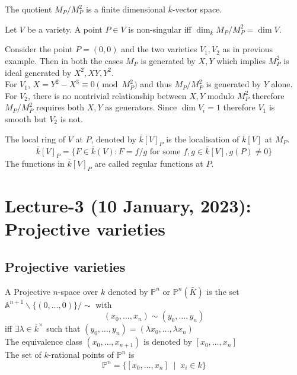 \documentclass[oneside, 12pt]{scrbook}
\theoremstyle{theorem}
\begin{document}
The quotient $M_{P}/M_{P}^2$ is a finite dimensional $\bar{k}$-vector space. 
\begin{proposition}
Let $V$ be a variety. A point $P \in V$ is non-singular iff $\dim_{\bar{k}} M_{P}/M_{P}^2 = \dim V$. 
\end{proposition}

\begin{example}
Consider the point $P = (0,0)$ and the two varieties $V_{1},V_{2}$ as in previous example. Then in both the cases $M_{P}$ is generated by $X,Y$ which implies $M_{P}^2$ is ideal generated by $X^2 , XY, Y^2$. \\

For $V_{1}$, $X=Y^2 - X^3 \equiv 0 \pmod{M_{P}^2}$ and thus $M_{P}/M_{P}^2$ is generated by $Y$ alone. \\

For $V_{2}$, there is no nontrivial relationship between $X,Y$ modulo $M_{P}^2$ therefore $M_{P}/M_{P}^2$ requires both $X,Y$ as generators. Since $\dim V_{i} = 1$ therefore $V_{1}$ is smooth but $V_{2}$ is not. 
\end{example}

\begin{proposition}
The local ring of $V$ at $P$, denoted by $\bar{k}[V]_{P}$ is the localisation of $\bar{k}[V]$ at $M_{P}$. 
\begin{equation}
\bar{k}[V]_{P} = \{F \in \bar{k}(V): F = f/g \text{ for some } f,g \in \bar{k}[V], g(P)\neq 0\}
\end{equation}
The functions in $\bar{k}[V]_{P}$ are called regular functions at $P$.
\end{proposition}

\chapter{Lecture-3 (10 January, 2023): Projective varieties}

\section{Projective varieties}

\begin{definition}
A Projective $n$-space over $k$ denoted by $\mathbb{P}^n$ or $\mathbb{P}^{n}(\bar{K})$ is the set $\mathbb{A}^{n+1} \backslash \{(0,\hdots , 0)\} / \sim$ with  
$$(x_{0}, \hdots ,x_{n}) \sim (y_{0},\hdots ,y_{n})$$ iff $\exists \lambda \in \bar{k}^{\times}$ such that $(y_{0},\hdots ,y_{n}) = (\lambda x_{0},\hdots ,\lambda x_{n})$\\
The equivalence class $(x_{0},\hdots ,x_{n+1})$ is denoted by $[x_{0},\hdots ,x_{n}]$\\
The set of $k$-rational points of $\mathbb{P}^n$ is $$\mathbb{P}^n = \{[x_{0}, \hdots , x_{n}]\; \mid \; x_{i} \in k\}$$
\end{definition}
\end{document}

